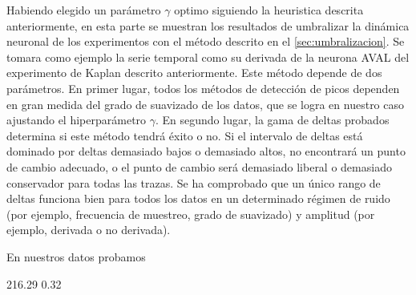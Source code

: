 Habiendo elegido un  parámetro $\gamma$ optimo  siguiendo la heuristica descrita anteriormente,   en esta parte se muestran los resultados de umbralizar la dinámica neuronal de los experimentos con el método descrito en el \cref{sec:umbralizacion}. Se tomara como ejemplo  la serie temporal  como  su derivada de la neurona AVAL  del  experimento de Kaplan descrito anteriormente.  Este método depende de dos parámetros. En primer lugar, todos los métodos de detección de picos dependen en gran medida del grado de suavizado de los datos, que se logra en nuestro caso ajustando el hiperparámetro $\gamma$. En segundo lugar, la gama de deltas probados determina si este método tendrá éxito o no. Si el intervalo de deltas está dominado por deltas demasiado bajos o demasiado altos, no encontrará un punto de cambio adecuado, o el punto de cambio será demasiado liberal o demasiado conservador para todas las trazas. Se ha  comprobado que un único rango de deltas funciona bien para todos los datos en un determinado régimen de ruido (por ejemplo, frecuencia de muestreo, grado de suavizado) y amplitud (por ejemplo, derivada o no derivada).

En nuestros datos probamos

216.29
0.32

\cite{rupprecht_database_2021}














